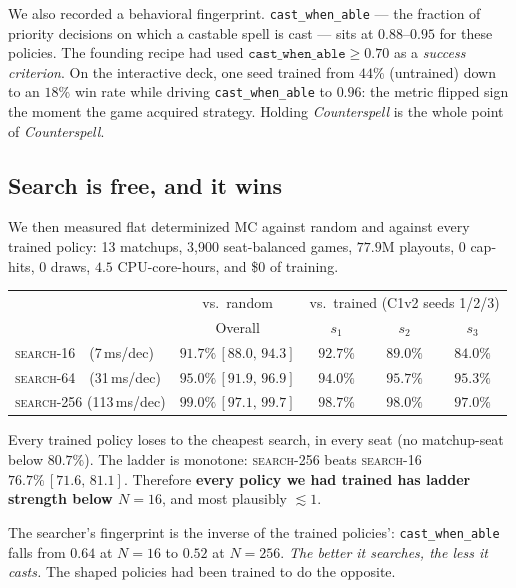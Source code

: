 \documentclass[11pt]{article}
\newcommand{\searchn}[1]{\textsc{search}-#1}
\newcommand{\ci}[2]{\,[#1,\,#2]}
\begin{document}
We also recorded a behavioral fingerprint. \texttt{cast\_when\_able} --- the fraction of priority decisions on which a castable spell is cast --- sits at $0.88$--$0.95$ for these policies. The founding recipe had used $\texttt{cast\_when\_able}\ge0.70$ as a \emph{success criterion}. On the interactive deck, one seed trained from $44\%$ (untrained) down to an $18\%$ win rate while driving \texttt{cast\_when\_able} to $0.96$: the metric flipped sign the moment the game acquired strategy. Holding \textit{Counterspell} is the whole point of \textit{Counterspell}.

\subsection{Search is free, and it wins}
\label{sec:search}

We then measured flat determinized MC against random and against every trained policy: 13 matchups, 3{,}900 seat-balanced games, $77.9$M playouts, $0$ cap-hits, $0$ draws, $4.5$ CPU-core-hours, and \$0 of training.

\begin{center}\small
\begin{tabular}{lcccc}
\toprule
& \multicolumn{1}{c}{vs.\ random} & \multicolumn{3}{c}{vs.\ trained (C1v2 seeds 1/2/3)} \\
\cmidrule(lr){2-2}\cmidrule(lr){3-5}
& Overall & $s_1$ & $s_2$ & $s_3$ \\
\midrule
\searchn{16}\ \ (7\,ms/dec)   & $91.7\%\ci{88.0}{94.3}$ & $92.7\%$ & $89.0\%$ & $84.0\%$ \\
\searchn{64}\ \ (31\,ms/dec)  & $95.0\%\ci{91.9}{96.9}$ & $94.0\%$ & $95.7\%$ & $95.3\%$ \\
\searchn{256} (113\,ms/dec)   & $99.0\%\ci{97.1}{99.7}$ & $98.7\%$ & $98.0\%$ & $97.0\%$ \\
\bottomrule
\end{tabular}
\end{center}

Every trained policy loses to the cheapest search, in every seat (no matchup-seat below $80.7\%$). The ladder is monotone: \searchn{256} beats \searchn{16} $76.7\%\ci{71.6}{81.1}$. Therefore \textbf{every policy we had trained has ladder strength below $N=16$}, and most plausibly $\lesssim1$.

The searcher's fingerprint is the inverse of the trained policies': \texttt{cast\_when\_able} falls from $0.64$ at $N=16$ to $0.52$ at $N=256$. \emph{The better it searches, the less it casts.} The shaped policies had been trained to do the opposite.
\end{document}
